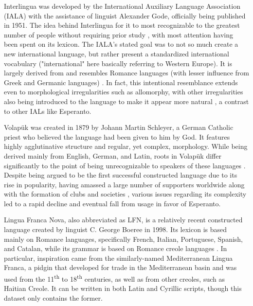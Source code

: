 \documentclass[12pt,a4paper]{article}
\numberwithin{figure}{section}
\numberwithin{table}{section}
\numberwithin{definition}{section}
\begin{document}
Interlingua was developed by the International Auxiliary Language Association (IALA) with the assistance of linguist Alexander Gode, officially being published in 1951. The idea behind Interlingua for it to most recognizable to the greatest number of people without requiring prior study \parencite{goodall2022article}, with most attention having been spent on its lexicon. The IALA's stated goal was to not so much create a new international language, but rather present a standardized international vocabulary \parencite{Large1985book} ("international" here basically referring to Western Europe). It is largely derived from and resembles Romance languages (with lesser influence from Greek and Germanic languages) \parencite{Schubert2001book}. In fact, this intentional resemblance extends even to morphological irregularities such as allomorphy, with other irregularities also being introduced to the language to make it appear more natural \parencite{goodall2022article}, a contrast to other IALs like Esperanto.

Volapük was created in 1879 by Johann Martin Schleyer, a German Catholic priest who believed the language had been given to him by God. It features highly agglutinative structure and regular, yet complex, morphology. While being derived mainly from English, German, and Latin, roots in Volapük differ significantly to the point of being unrecognizable to speakers of these languages \parencite{goodall2022article}. Despite being argued to be the first successful constructed language due to its rise in popularity, having amassed a large number of supporters worldwide along with the formation of clubs and societies \parencite{Gobbo2016article}, various issues regarding its complexity led to a rapid decline and eventual fall from usage in favor of Esperanto.


Lingua Franca Nova, also abbreviated as LFN, is a relatively recent constructed language created by linguist C. George Boeree in 1998. Its lexicon is based mainly on Romance languages, specifically French, Italian, Portuguese, Spanish, and Catalan, while its grammar is based on Romance creole languages \parencite{Pawlas2020inbook}. In particular, inspiration came from the similarly-named Mediterranean Lingua Franca, a pidgin that developed for trade in the Mediterranean basin and was used from the 11\textsuperscript{th} to 18\textsuperscript{th} centuries, as well as from other creoles, such as Haitian Creole. It can be written in both Latin and Cyrillic scripts, though this dataset only contains the former. 
\end{document}
